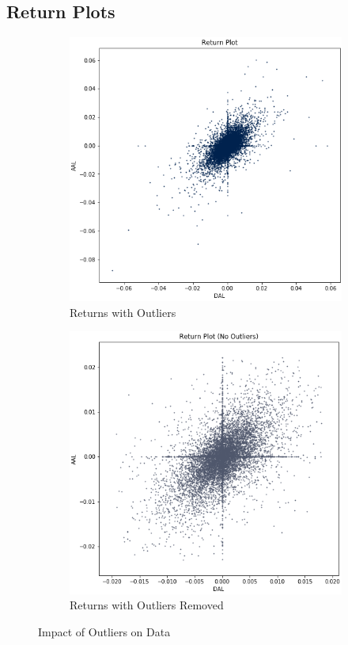 \documentclass{article}
\begin{document}
\newpage
\subsection{Return Plots}
\begin{figure}[h!]
  \centering
  \begin{subfigure}{.5\textwidth}
    \centering
    \includegraphics[width=.95\linewidth]{../Figures/return_plot_out.png}
    \caption{Returns with Outliers}
  \end{subfigure}%
  \begin{subfigure}{.5\textwidth}
    \centering
    \includegraphics[width=.95\linewidth]{../Figures/return_plot_no_out.png}
    \caption{Returns with Outliers Removed}
  \end{subfigure}
  \caption{Impact of Outliers on Data}
\end{figure}
\end{document}
